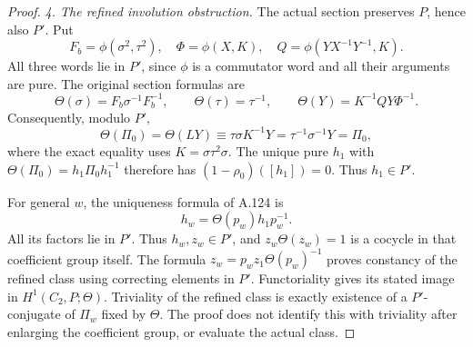 \begin{proof}
\emph{4. The refined involution obstruction.}
The actual section preserves \(P\), hence also \(P'\).
Put
\[
 F_b=\phi(\sigma^2,\tau^2),\quad
 \Phi=\phi(X,K),\quad Q=\phi(YX^{-1}Y^{-1},K).
\]
All three words lie in \(P'\), since \(\phi\) is a
commutator word and all their arguments are pure.
The original section formulas are
\[
 \Theta(\sigma)=F_b\sigma^{-1}F_b^{-1},\qquad
 \Theta(\tau)=\tau^{-1},\qquad
 \Theta(Y)=K^{-1}QY\Phi^{-1}.
\]
Consequently, modulo \(P'\),
\[
 \Theta(\Pi_0)=\Theta(LY)
       \equiv\tau\sigma K^{-1}Y
       =\tau^{-1}\sigma^{-1}Y=\Pi_0,                          \tag{A.125.6}
\]
where the exact equality uses \(K=\sigma\tau^2\sigma\).
The unique pure \(h_1\) with
\(\Theta(\Pi_0)=h_1\Pi_0h_1^{-1}\) therefore has
\((1-\rho_0)([h_1])=0\). Thus \(h_1\in P'\).

For general \(w\), the uniqueness formula of A.124 is
\[
 h_w=\Theta(p_w)h_1p_w^{-1}.
\]
All its factors lie in \(P'\). Thus \(h_w,z_w\in P'\),
and \(z_w\Theta(z_w)=1\) is a cocycle in that coefficient
group itself. The formula
\(z_w=p_wz_1\Theta(p_w)^{-1}\) proves constancy of the
refined class using correcting elements in \(P'\).
Functoriality gives its stated image in \(H^1(C_2,P;\Theta)\).
Triviality of the refined class is exactly existence of a
\(P'\)-conjugate of \(\Pi_w\) fixed by \(\Theta\).
The proof does not identify this with triviality after
enlarging the coefficient group, or evaluate the actual class.
\end{proof}
